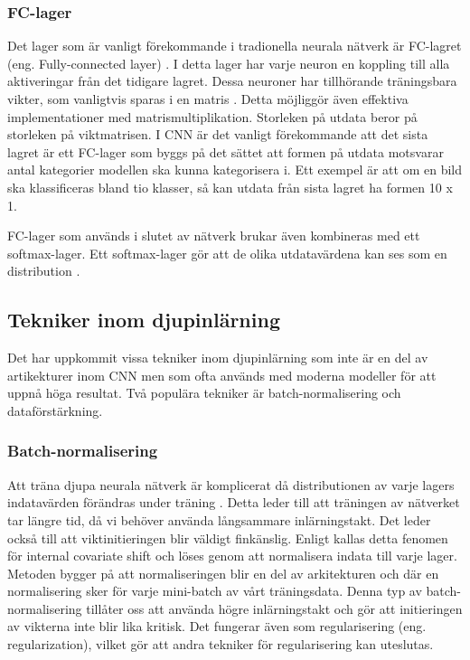 \documentclass[]{kththesis}
\begin{document}
\subsubsection{FC-lager}
Det lager som är vanligt förekommande i tradionella neurala nätverk är FC-lagret (eng. Fully-connected layer) \parencite{krizhevsky2012imagenet}. I detta lager har varje neuron en koppling till alla aktiveringar från det tidigare lagret. Dessa neuroner har tillhörande träningsbara vikter, som vanligtvis sparas i en matris \parencite{Goodfellow-et-al-2016}. Detta möjliggör även effektiva implementationer med matrismultiplikation. Storleken på utdata beror på storleken på viktmatrisen. I CNN är det vanligt förekommande att det sista lagret är ett FC-lager som byggs på det sättet att formen på utdata motsvarar antal kategorier modellen ska kunna kategorisera i. Ett exempel är att om en bild ska klassificeras bland tio klasser, så kan utdata från sista lagret ha formen 10 x 1.

FC-lager som används i slutet av nätverk brukar även kombineras med ett softmax-lager. Ett softmax-lager gör att de olika utdatavärdena kan ses som en distribution \parencite{Goodfellow-et-al-2016}.

\subsection{Tekniker inom djupinlärning}
Det har uppkommit vissa tekniker inom djupinlärning som inte är en del av artikekturer inom CNN men som ofta används med moderna modeller för att uppnå höga resultat. Två populära tekniker är batch-normalisering och dataförstärkning.

\subsubsection{Batch-normalisering}
Att träna djupa neurala nätverk är komplicerat då distributionen av varje lagers indatavärden förändras under träning \parencite{ioffe2015batch}. Detta leder till att träningen av nätverket tar längre tid, då vi behöver använda långsammare inlärningstakt. Det leder också till att viktinitieringen blir väldigt finkänslig. Enligt \textcite{ioffe2015batch} kallas detta fenomen för internal covariate shift och löses genom att normalisera indata till varje lager. Metoden bygger på att normaliseringen blir en del av arkitekturen och där en normalisering sker för varje mini-batch av vårt träningsdata. Denna typ av batch-normalisering tillåter oss att använda högre inlärningstakt och gör att initieringen av vikterna inte blir lika kritisk. Det fungerar även som regularisering (eng. regularization), vilket gör att andra tekniker för regularisering kan uteslutas.
\end{document}
